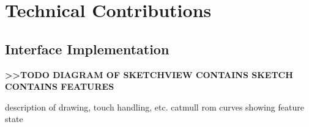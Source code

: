 \chapter{Technical Contributions}

\section{Interface Implementation}\label{interface-implementation}

\textbf{\textgreater{}\textgreater{}TODO DIAGRAM OF SKETCHVIEW CONTAINS
SKETCH CONTAINS FEATURES}

description of drawing, touch handling, etc. catmull rom curves showing
feature state
